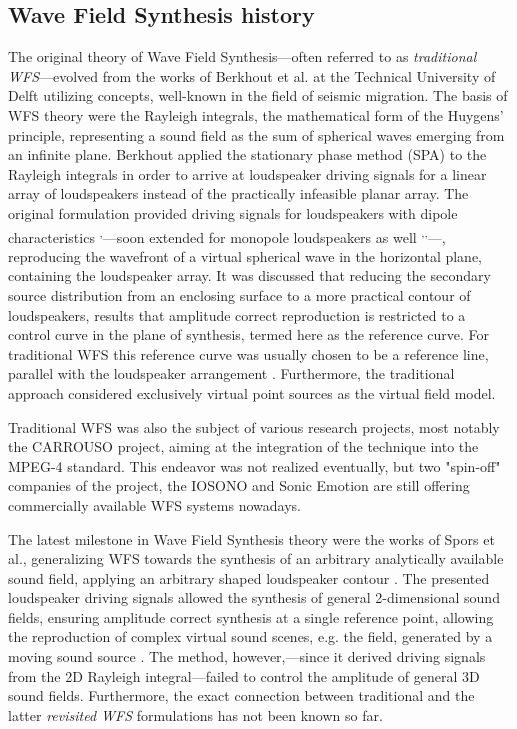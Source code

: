 \documentclass[10pt,twoside]{article}
\theoremstyle{thesisgroupstyle}
\theoremstyle{indented}
\begin{document}
\subsection{Wave Field Synthesis history}
%
The original theory of Wave Field Synthesis---often referred to as \emph{traditional WFS}---evolved from the works of Berkhout et al. at the Technical University of Delft utilizing concepts, well-known in the field of seismic migration.
The basis of WFS theory were the Rayleigh integrals, the mathematical form of the Huygens' principle, representing a sound field as the sum of spherical waves emerging from an infinite plane.
Berkhout applied the stationary phase method (SPA) to the Rayleigh integrals in order to arrive at loudspeaker driving signals for a linear array of loudspeakers instead of the practically infeasible planar array.
The original formulation provided driving signals for loudspeakers with dipole characteristics \textsuperscript{,}---soon extended for monopole loudspeakers as well \textsuperscript{,}\textsuperscript{,}---, reproducing the wavefront of a virtual spherical wave in the horizontal plane, containing the loudspeaker array.
It was discussed that reducing the secondary source distribution from an enclosing surface to a more practical contour of loudspeakers, results that amplitude correct reproduction is restricted to a control curve in the plane of synthesis, termed here as the reference curve.
For traditional WFS this reference curve was usually chosen to be a reference line, parallel with the loudspeaker arrangement .
Furthermore, the traditional approach considered exclusively virtual point sources as the virtual field model.

Traditional WFS was also the subject of various research projects, most notably the CARROUSO project, aiming at the integration of the technique into the MPEG-4 standard. This endeavor was not realized eventually, but two "spin-off" companies of the project, the IOSONO and Sonic Emotion are still offering commercially available WFS systems nowadays.

The latest milestone in Wave Field Synthesis theory were the works of Spors et al., generalizing WFS towards the synthesis of an arbitrary analytically available sound field, applying an arbitrary shaped loudspeaker contour .
The presented loudspeaker driving signals allowed the synthesis of general 2-dimensional sound fields, ensuring amplitude correct synthesis at a single reference point,
allowing the reproduction of complex virtual sound scenes, e.g. the field, generated by a moving sound source .
The method, however,---since it derived driving signals from the 2D Rayleigh integral---failed to control the amplitude of general 3D sound fields.
Furthermore, the exact connection between traditional and the latter \emph{revisited WFS} formulations has not been known so far.
\end{document}
